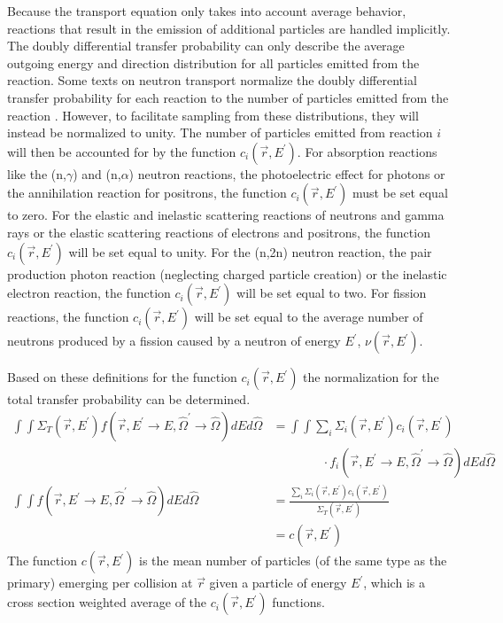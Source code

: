 Because the transport equation only takes into account average behavior, 
reactions that result in the emission of additional particles are handled 
implicitly. The doubly differential transfer probability can only describe the
average outgoing energy and direction distribution for all particles emitted
from the reaction. Some texts on neutron transport normalize the doubly
differential transfer probability for each reaction to the number of particles 
emitted from the reaction \citep{bell_nuclear_1979}. However, to facilitate 
sampling from these distributions, they will instead be normalized to unity. 
The number of particles emitted from reaction $i$ will then be accounted for by 
the function $c_i(\vec{r},E^{'})$. For absorption reactions like the 
(n,$\gamma$) and (n,$\alpha$) neutron reactions, the photoelectric effect for 
photons or the annihilation reaction for positrons, the function 
$c_i(\vec{r},E^{'})$ must be set equal to zero. For the elastic and inelastic 
scattering reactions of neutrons and gamma rays or the elastic scattering
reactions of electrons and positrons, the function $c_i(\vec{r},E^{'})$ will be 
set equal to unity. For the (n,2n) neutron reaction, the pair production photon 
reaction (neglecting charged particle creation) or the inelastic electron 
reaction, the function $c_i(\vec{r},E^{'})$ will be set equal to two. For 
fission reactions, the function $c_i(\vec{r},E^{'})$ will be set equal to the 
average number of neutrons produced by a fission caused by a neutron of energy 
$E^{'}$, $\nu(\vec{r},E^{'})$.

Based on these definitions for the function $c_i(\vec{r},E^{'})$ the 
normalization for the total transfer probability can be determined.
\begin{align}
  \int\int   \Sigma_T(\vec{r},E^{'})
  f(\vec{r},E^{'} \to E,\hat{\Omega}^{'} \to \hat{\Omega}) 
  dEd\hat{\Omega}
  & = \int\int \sum_i \Sigma_i(\vec{r},E^{'}) c_i(\vec{r},E^{'}) \nonumber \\
  & \qquad \quad \quad \cdot  
  f_i(\vec{r},E^{'} \to E,\hat{\Omega}^{'} \to \hat{\Omega}) 
  dEd\hat{\Omega} \nonumber \\
  \int\int f(\vec{r},E^{'} \to E,\hat{\Omega}^{'} \to \hat{\Omega}) 
  dEd\hat{\Omega} 
  & = \frac{\sum_i \Sigma_i(\vec{r},E^{'}) c_i(\vec{r},E^{'})}
             {\Sigma_T(\vec{r},E^{'})} \nonumber \\
  & = c(\vec{r},E^{'}) 
\end{align}
The function $c(\vec{r},E^{'})$ is the mean number of particles (of the same 
type as the primary) emerging per collision at $\vec{r}$ given a particle of 
energy $E^{'}$, which is a cross section weighted average of the 
$c_i(\vec{r},E^{'})$ functions.
  

